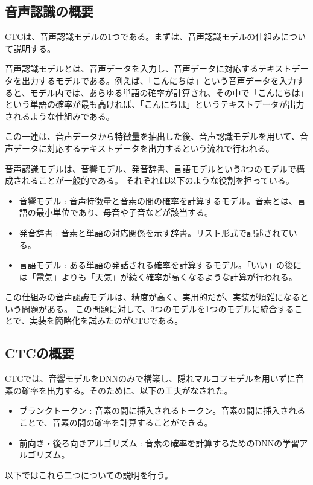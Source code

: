 \documentclass{ltjsarticle}
\begin{document}
\subsection{音声認識の概要}
CTCは、音声認識モデルの1つである。まずは、音声認識モデルの仕組みについて説明する。
\par
音声認識モデルとは、音声データを入力し、音声データに対応するテキストデータを出力するモデルである。例えば、「こんにちは」という音声データを入力すると、モデル内では、あらゆる単語の確率が計算され、その中で「こんにちは」という単語の確率が最も高ければ、「こんにちは」というテキストデータが出力されるような仕組みである。
\par
この一連は、音声データから特徴量を抽出した後、音声認識モデルを用いて、音声データに対応するテキストデータを出力するという流れで行われる。
\par
音声認識モデルは、音響モデル、発音辞書、言語モデルという3つのモデルで構成されることが一般的である。
それぞれは以下のような役割を担っている。
\begin{itemize}
  \item 音響モデル : 音声特徴量と音素の間の確率を計算するモデル。音素とは、言語の最小単位であり、母音や子音などが該当する。
  \item 発音辞書 : 音素と単語の対応関係を示す辞書。リスト形式で記述されている。
  \item 言語モデル : ある単語の発話される確率を計算するモデル。「いい」の後には「電気」よりも「天気」が続く確率が高くなるような計算が行われる。
\end{itemize}
この仕組みの音声認識モデルは、精度が高く、実用的だが、実装が煩雑になるという問題がある。
この問題に対して、3つのモデルを1つのモデルに統合することで、実装を簡略化を試みたのがCTCである。

\subsection{CTCの概要}
CTCでは、音響モデルをDNNのみで構築し、隠れマルコフモデルを用いずに音素の確率を出力する。そのために、以下の工夫がなされた。
\begin{itemize}
  \item ブランクトークン : 音素の間に挿入されるトークン。音素の間に挿入されることで、音素の間の確率を計算することができる。
  \item 前向き・後ろ向きアルゴリズム : 音素の確率を計算するためのDNNの学習アルゴリズム。
\end{itemize}
以下ではこれら二つについての説明を行う。
\end{document}
